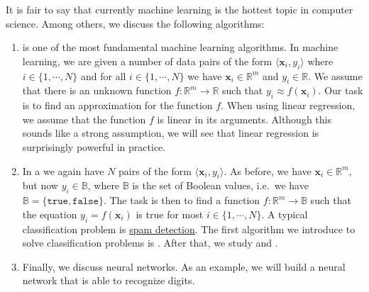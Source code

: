 \begin{enumerate}
      It is fair to say that
      currently machine learning is the hottest topic in computer science.  Among others, we discuss the following
      algorithms:
      \begin{enumerate}
      \item {} is one of the most fundamental machine learning algorithms.
            In machine learning, we are given a number of data pairs of the form  $\langle \mathbf{x}_i, y_i \rangle$ 
            where $i \in \{1,\cdots,N\}$ and for all $i \in \{1,\cdots,N\}$ we have $\mathbf{x}_i \in \mathbb{R}^m$
            and $y_i \in \mathbb{R}$.  We assume that there is an unknown function $f:\mathbb{R}^m \rightarrow \mathbb{R}$
            such that $y_i \approx f(\mathbf{x}_i)$.  Our task is to find an approximation for the function
            $f$.  When using linear regression, we assume that the function $f$ is linear in its arguments.
            Although this sounds like a strong assumption, we will see that linear regression is surprisingly
            powerful in practice.
      \item In a  we again have $N$ pairs of the form $\langle \mathbf{x}_i, y_i
        \rangle$.
            As before,  we have $\mathbf{x}_i \in \mathbb{R}^m$, but now $y_i \in \mathbb{B}$, where
            $\mathbb{B}$ is the set of Boolean values, i.e.~we have $\mathbb{B} = \{\mathtt{true}, \mathtt{false}\}$.
            The task is then to find a function $f:\mathbb{R}^m \rightarrow \mathbb{B}$
            such that the equation $y_i = f(\mathbf{x}_i)$ is true for most $i\in\{1,\cdots,N\}$.  A typical
            classification problem is \href{https://en.wikipedia.org/wiki/Email_spam}{spam detection}.  The
            first algorithm we introduce to solve classification problems is .
            After that, we study  and .
      \item Finally, we discuss neural networks.  As an example, we will build a neural network that is able to
            recognize digits. 
      \end{enumerate}
\end{enumerate}

